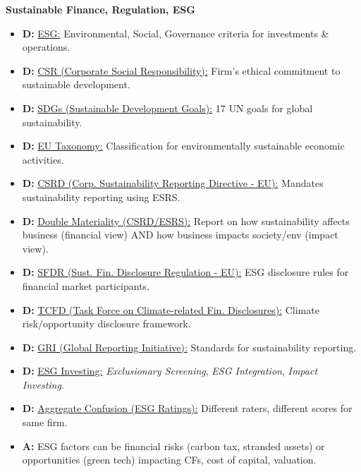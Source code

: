 \documentclass[7pt,landscape]{extarticle} %
\newcommand{\cheatsheetsubsubsection}[1]{%
  \vspace{0.15ex plus 0.05ex minus 0.05ex}%
  \noindent\textbf{\sffamily\scriptsize #1}%
  \par\vspace{0.05ex}%
}
\newcommand{\D}[1]{\textbf{\textcolor{DefColor}{D:}} \uline{#1}}
\newcommand{\A}[1]{\textbf{\textcolor{AppColor}{A:}} #1}
\begin{document}
\begin{multicols*}{4}
  \cheatsheetsubsubsection{Sustainable Finance, Regulation, ESG}
  \begin{itemize}
    \item \D{ESG:} Environmental, Social, Governance criteria for investments \& operations.
    \item \D{CSR (Corporate Social Responsibility):} Firm's ethical commitment to sustainable development.
    \item \D{SDGs (Sustainable Development Goals):} 17 UN goals for global sustainability.
    \item \D{EU Taxonomy:} Classification for environmentally sustainable economic activities.
    \item \D{CSRD (Corp. Sustainability Reporting Directive - EU):} Mandates sustainability reporting using ESRS.
    \item \D{Double Materiality (CSRD/ESRS):} Report on how sustainability affects business (financial view) AND how business impacts society/env (impact view).
    \item \D{SFDR (Sust. Fin. Disclosure Regulation - EU):} ESG disclosure rules for financial market participants.
    \item \D{TCFD (Task Force on Climate-related Fin. Disclosures):} Climate risk/opportunity disclosure framework.
    \item \D{GRI (Global Reporting Initiative):} Standards for sustainability reporting.
    \item \D{ESG Investing:} \emph{Exclusionary Screening}, \emph{ESG Integration}, \emph{Impact Investing}.
    \item \D{Aggregate Confusion (ESG Ratings):} Different raters, different scores for same firm.
    \item \A{ESG factors can be financial risks (carbon tax, stranded assets) or opportunities (green tech) impacting CFs, cost of capital, valuation.}
  \end{itemize}
  

\end{multicols*}
\end{document}
